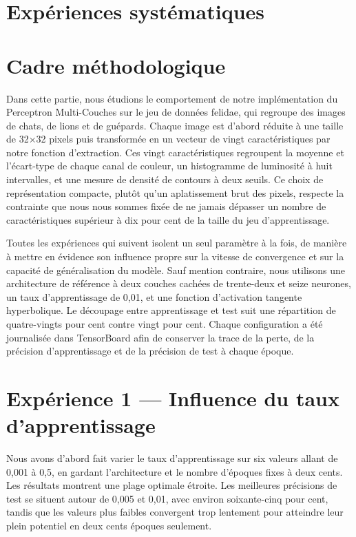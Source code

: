 \documentclass[11pt,a4paper]{report}
\begin{document}
\hypertarget{expuxe9riences-systuxe9matiques}{%
\section{Expériences
systématiques}\label{expuxe9riences-systuxe9matiques}}

\hypertarget{cadre-muxe9thodologique-1}{%
\section{Cadre méthodologique}\label{cadre-muxe9thodologique-1}}

Dans cette partie, nous étudions le comportement de notre implémentation
du Perceptron Multi-Couches sur le jeu de données felidae, qui regroupe
des images de chats, de lions et de guépards. Chaque image est d'abord
réduite à une taille de 32×32 pixels puis transformée en un vecteur de
vingt caractéristiques par notre fonction d'extraction. Ces vingt
caractéristiques regroupent la moyenne et l'écart-type de chaque canal
de couleur, un histogramme de luminosité à huit intervalles, et une
mesure de densité de contours à deux seuils. Ce choix de représentation
compacte, plutôt qu'un aplatissement brut des pixels, respecte la
contrainte que nous nous sommes fixée de ne jamais dépasser un nombre de
caractéristiques supérieur à dix pour cent de la taille du jeu
d'apprentissage.

Toutes les expériences qui suivent isolent un seul paramètre à la fois,
de manière à mettre en évidence son influence propre sur la vitesse de
convergence et sur la capacité de généralisation du modèle. Sauf mention
contraire, nous utilisons une architecture de référence à deux couches
cachées de trente-deux et seize neurones, un taux d'apprentissage de
0,01, et une fonction d'activation tangente hyperbolique. Le découpage
entre apprentissage et test suit une répartition de quatre-vingts pour
cent contre vingt pour cent. Chaque configuration a été journalisée dans
TensorBoard afin de conserver la trace de la perte, de la précision
d'apprentissage et de la précision de test à chaque époque.

\hypertarget{expuxe9rience-1-influence-du-taux-dapprentissage-1}{%
\section{Expérience 1 --- Influence du taux
d'apprentissage}\label{expuxe9rience-1-influence-du-taux-dapprentissage-1}}

Nous avons d'abord fait varier le taux d'apprentissage sur six valeurs
allant de 0,001 à 0,5, en gardant l'architecture et le nombre d'époques
fixes à deux cents. Les résultats montrent une plage optimale étroite.
Les meilleures précisions de test se situent autour de 0,005 et 0,01,
avec environ soixante-cinq pour cent, tandis que les valeurs plus
faibles convergent trop lentement pour atteindre leur plein potentiel en
deux cents époques seulement.
\end{document}

